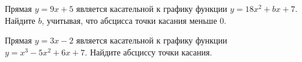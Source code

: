 \begin{homework}[number=3]
	\begin{listofex}
		\item Прямая \( y=9x+5 \) является касательной к графику функции \( y=18x^2+bx+7 \). Найдите \( b \), учитывая, что абсцисса точки касания меньше \( 0 \).
		\item Прямая \( y=3x-2 \) является касательной к графику функции \( y=x^3-5x^2+6x+7 \). Найдите абсциссу точки касания.
	\end{listofex}
\end{homework}

%	

